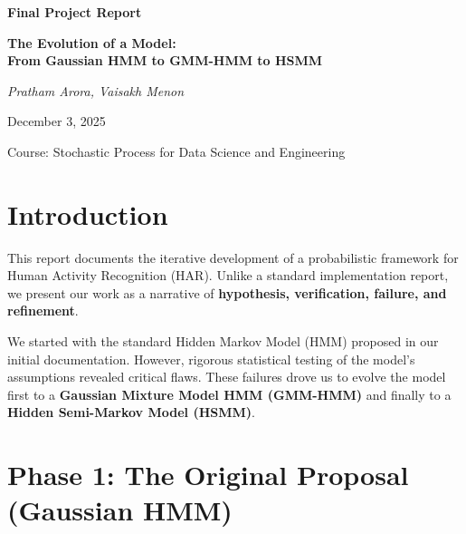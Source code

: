 \documentclass[11pt,a4paper]{article}
\begin{document}
\begin{titlepage}
    \centering
    \vspace*{2cm}
    
    {\LARGE\bfseries Final Project Report\par}
    \vspace{1cm}
    {\Huge\bfseries The Evolution of a Model:\\[0.5em] From Gaussian HMM to GMM-HMM to HSMM\par}
    \vspace{2cm}
    
    {\Large\itshape Pratham Arora, Vaisakh Menon\par}
    
    {\large December 3, 2025\par}
    
    \vfill
    
    {\large Course: Stochastic Process for Data Science and Engineering\par}
    
\end{titlepage}

\tableofcontents
\newpage

\section{Introduction}

This report documents the iterative development of a probabilistic framework for Human Activity Recognition (HAR). Unlike a standard implementation report, we present our work as a narrative of \textbf{hypothesis, verification, failure, and refinement}.

We started with the standard Hidden Markov Model (HMM) proposed in our initial documentation. However, rigorous statistical testing of the model's assumptions revealed critical flaws. These failures drove us to evolve the model first to a \textbf{Gaussian Mixture Model HMM (GMM-HMM)} and finally to a \textbf{Hidden Semi-Markov Model (HSMM)}.

\section{Phase 1: The Original Proposal (Gaussian HMM)}
\end{document}
